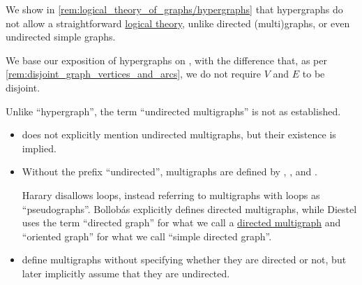 \begin{comments}
  \item We show in \cref{rem:logical_theory_of_graphs/hypergraphs} that hypergraphs do not allow a straightforward \hyperref[def:logical_theory]{logical theory}, unlike directed (multi)graphs, or even undirected simple graphs.

  \item We base our exposition of hypergraphs on \cite{DörflerWaller1980Hypergraphs}, with the difference that, as per \cref{rem:disjoint_graph_vertices_and_arcs}, we do not require \( V \) and \( E \) to be disjoint.

  \item Unlike \enquote{hypergraph}, the term \enquote{undirected multigraphs} is not as established.
  \begin{itemize}
    \item \Textcite[def. 1.1.2]{Knauer2019AlgebraicGraphTheory} does not explicitly mention undirected multigraphs, but their existence is implied.

    \item Without the prefix \enquote{undirected}, multigraphs are defined by
    \textcite[10]{Harary1969GraphTheory},
    \textcite[28]{Diestel2017GraphTheory},
    \textcite[6]{Bollobás1998ModernGraphTheory} and
    \textcite[674]{Rosen2019DiscreteMathematics}.

    Harary disallows loops, instead referring to multigraphs with loops as \enquote{pseudographs}. Bollob\'as explicitly defines directed multigraphs, while Diestel uses the term \enquote{directed graph} for what we call a \hyperref[def:directed_multigraph]{directed multigraph} and \enquote{oriented graph} for what we call \enquote{simple directed graph}.

    \item \Textcite[3]{GondranMinoux1984GraphsAndAlgorithms} define multigraphs without specifying whether they are directed or not, but later implicitly assume that they are undirected.
  \end{itemize}
\end{comments}

